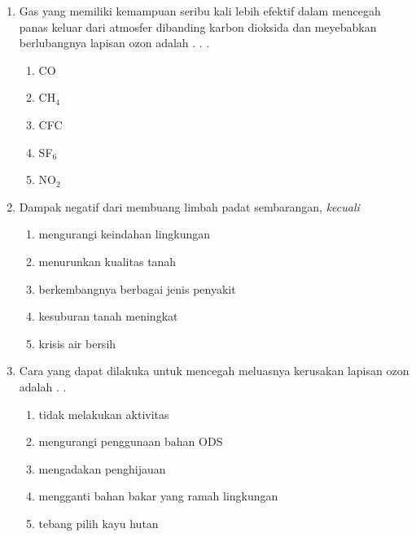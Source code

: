 \documentclass[10pt,a4paper]{extarticle}
\newcommand*\pilgan[1]{
\begin{enumerate}[label=\Alph*., itemsep=0pt,topsep=0pt,leftmargin=*,align=Center] #1 
\end{enumerate}}
\newcommand{\pilgani}[1]{                            \vspace{-0.3cm}\begin{multicols}{2}
 \begin{enumerate}[label=\Alph*., itemsep=0pt,topsep=0pt,leftmargin=*,align=Center]#1                     \end{enumerate}
 \phantom{ini cuma sapi, wedus, dan ayam}
 \end{multicols}}
\begin{document}
\begin{multicols*}{3}
\begin{enumerate}
\item Gas yang memiliki kemampuan seribu kali lebih efektif dalam mencegah panas keluar dari atmosfer dibanding karbon dioksida dan meyebabkan berlubangnya lapisan ozon adalah . . .
\pilgani{
   \item CO
   \item CH$_4$
   \item CFC
   \item SF$_6$
   \item NO$_2$
}
\item Dampak negatif dari membuang limbah padat sembarangan, \textit{kecuali}
\pilgan{
   \item mengurangi keindahan lingkungan 
   \item menurunkan kualitas tanah
   \item berkembangnya berbagai jenis penyakit
   \item kesuburan tanah meningkat
   \item krisis air bersih}

\item Cara yang dapat dilakuka untuk mencegah meluasnya kerusakan lapisan ozon adalah . . 
\pilgan{
   \item tidak melakukan aktivitas
   \item mengurangi penggunaan bahan ODS
   \item mengadakan penghijauan
   \item mengganti bahan bakar yang ramah lingkungan
   \item tebang pilih kayu hutan
}


\end{enumerate}
\end{multicols*}
\end{document}
